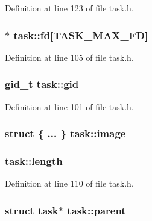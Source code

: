 Definition at line 123 of file task.\+h.

\hypertarget{structtask_afeeb6bafaefe505e6a730dd4e0be5a1a}{
\subsubsection[{fd}]{$\ast$ task\+::fd\mbox{[}{\bf T\+A\+S\+K\+\_\+\+M\+A\+X\+\_\+\+F\+D}\mbox{]}}}\label{structtask_afeeb6bafaefe505e6a730dd4e0be5a1a}


Definition at line 105 of file task.\+h.

\hypertarget{structtask_aaf3b6e15445e766a5c4823b815bca630}{
\subsubsection[{gid}]{\setlength{\rightskip}{0pt plus 5cm}gid\+\_\+t task\+::gid}}\label{structtask_aaf3b6e15445e766a5c4823b815bca630}


Definition at line 101 of file task.\+h.

\hypertarget{structtask_a3eac6c8a544ff49a836c5eed9ec48107}{
\subsubsection[{image}]{\setlength{\rightskip}{0pt plus 5cm}struct \{ ... \}   task\+::image}}\label{structtask_a3eac6c8a544ff49a836c5eed9ec48107}
\hypertarget{structtask_aa90dc3e7e232d6ba3f04700b3197b366}{
\subsubsection[{length}]{ task\+::length}}\label{structtask_aa90dc3e7e232d6ba3f04700b3197b366}


Definition at line 110 of file task.\+h.

\hypertarget{structtask_a34c6613744820a1e8127756fb6a5392c}{
\subsubsection[{parent}]{\setlength{\rightskip}{0pt plus 5cm}struct {\bf task}$\ast$ task\+::parent}}\label{structtask_a34c6613744820a1e8127756fb6a5392c}



